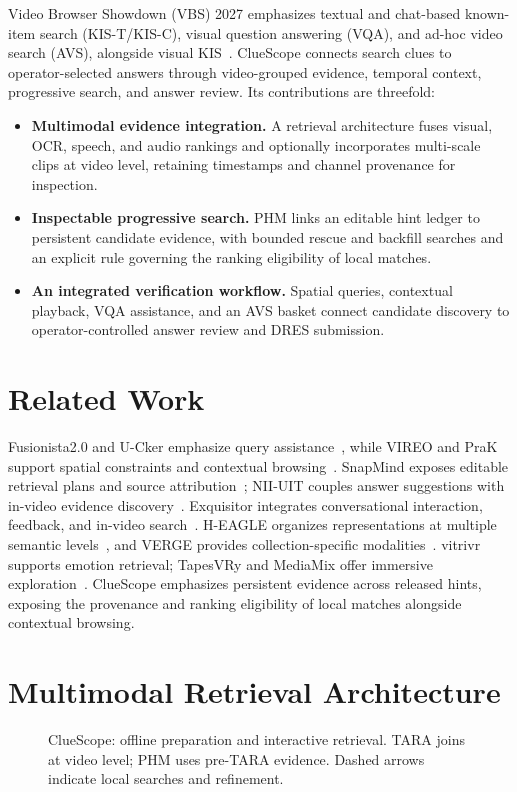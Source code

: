 \documentclass[runningheads]{llncs}
\begin{document}
Video Browser Showdown (VBS) 2027 emphasizes textual and chat-based known-item
search (KIS-T/KIS-C), visual question answering (VQA), and ad-hoc video search
(AVS), alongside visual KIS~\cite{vbs2027}. ClueScope
connects search clues to operator-selected answers through video-grouped
evidence, temporal context, progressive search, and answer review. Its contributions are threefold:
\begin{itemize}
\item \textbf{Multimodal evidence integration.} A retrieval architecture fuses
visual, OCR, speech, and audio rankings and optionally incorporates multi-scale
clips at video level, retaining timestamps and channel provenance for inspection.
\item \textbf{Inspectable progressive search.} PHM links an editable hint ledger
to persistent candidate evidence, with bounded rescue and backfill searches and
an explicit rule governing the ranking eligibility of local matches.
\item \textbf{An integrated verification workflow.} Spatial queries, contextual
playback, VQA assistance, and an AVS basket connect candidate discovery to
operator-controlled answer review and DRES submission.
\end{itemize}

\section{Related Work}
Fusionista2.0 and U-Cker emphasize query assistance~\cite{fusionista2026,ucker2026}, while VIREO and PraK support
spatial constraints and contextual browsing~\cite{vireo2026,prak2026}.
SnapMind exposes editable retrieval plans and source attribution~\cite{snapmind2026};
NII-UIT couples answer suggestions with in-video evidence discovery~\cite{nii2026}.
Exquisitor integrates conversational interaction, feedback, and in-video
search~\cite{exquisitor2026,exquisitor2025interactive}. H-EAGLE organizes representations at multiple
semantic levels~\cite{heagle2026}, and VERGE provides collection-specific
modalities~\cite{verge2026}. vitrivr supports emotion retrieval; TapesVRy and MediaMix offer immersive
exploration~\cite{vitrivr2026,tapesvry2026,mediamix2026}.
ClueScope emphasizes persistent evidence across released hints, exposing the
provenance and ranking eligibility of local matches alongside contextual browsing.

\section{Multimodal Retrieval Architecture}
\label{sec:architecture}
\begin{figure}[htbp]
\centering
\resizebox{\textwidth}{!}{}
\caption{ClueScope: offline preparation and interactive retrieval. TARA joins at video
level; PHM uses pre-TARA evidence. Dashed arrows indicate local searches and refinement.}
\label{fig:architecture}
\end{figure}
\end{document}

